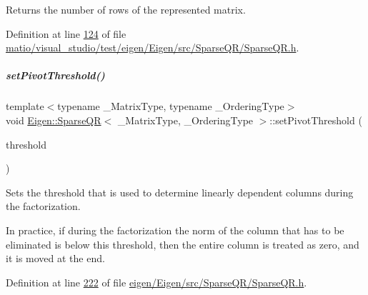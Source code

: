\begin{DoxyReturn}{Returns}
the number of rows of the represented matrix. 
\end{DoxyReturn}


Definition at line \hyperlink{matio_2visual__studio_2test_2eigen_2_eigen_2src_2_sparse_q_r_2_sparse_q_r_8h_source_l00124}{124} of file \hyperlink{matio_2visual__studio_2test_2eigen_2_eigen_2src_2_sparse_q_r_2_sparse_q_r_8h_source}{matio/visual\+\_\+studio/test/eigen/\+Eigen/src/\+Sparse\+Q\+R/\+Sparse\+Q\+R.\+h}.

\mbox{\label{group___sparse_q_r___module_adb7bfa65f99e3ef91ed58ea663a850a1}} 
\subparagraph{\texorpdfstring{set\+Pivot\+Threshold()}{setPivotThreshold()}\hspace{0.1cm}{\footnotesize\ttfamily [1/2]}}
{\footnotesize\ttfamily template$<$typename \+\_\+\+Matrix\+Type, typename \+\_\+\+Ordering\+Type$>$ \\
void \hyperlink{group___sparse_q_r___module_class_eigen_1_1_sparse_q_r}{Eigen\+::\+Sparse\+QR}$<$ \+\_\+\+Matrix\+Type, \+\_\+\+Ordering\+Type $>$\+::set\+Pivot\+Threshold (\begin{DoxyParamCaption}\item[{const Real\+Scalar \&}]{threshold }\end{DoxyParamCaption})\hspace{0.3cm}{\ttfamily [inline]}}

Sets the threshold that is used to determine linearly dependent columns during the factorization.

In practice, if during the factorization the norm of the column that has to be eliminated is below this threshold, then the entire column is treated as zero, and it is moved at the end. 

Definition at line \hyperlink{eigen_2_eigen_2src_2_sparse_q_r_2_sparse_q_r_8h_source_l00222}{222} of file \hyperlink{eigen_2_eigen_2src_2_sparse_q_r_2_sparse_q_r_8h_source}{eigen/\+Eigen/src/\+Sparse\+Q\+R/\+Sparse\+Q\+R.\+h}.

